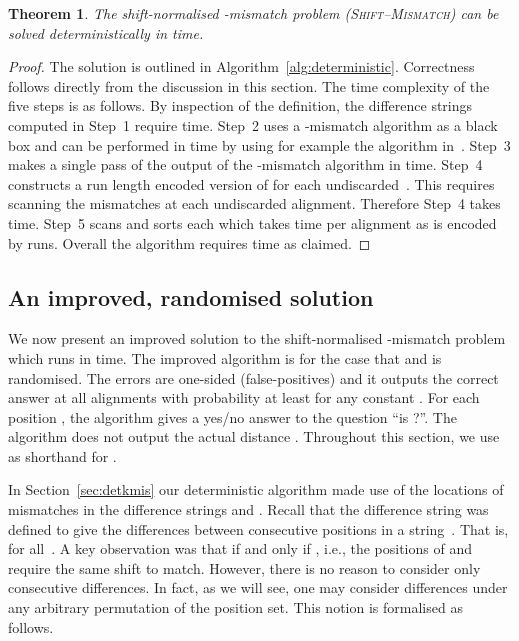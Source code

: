 \documentclass[11pt]{article}
\newcommand{\skMismatch}{\textsc{Shift--Mismatch}\xspace}
\theoremstyle{plain}
\newtheorem{theorem}{Theorem}[]
\theoremstyle{definition}
\begin{document}
\begin{theorem}
    \label{thm:detkmis}
    The shift-normalised -mismatch problem (\skMismatch) can be solved deterministically in  time.
\end{theorem}
\begin{proof}
    The solution is outlined in Algorithm~\ref{alg:deterministic}. Correctness follows directly from the discussion in this section. The time complexity of the five steps is as follows. By inspection of the definition, the difference strings computed in Step~1 require  time. Step~2 uses a -mismatch algorithm as a black box and can be performed in  time by using for example the algorithm in~\cite{LV:1986a}. Step~3 makes a single pass of the output of the -mismatch algorithm in  time. Step~4 constructs a run length encoded version of  for each undiscarded~. This requires scanning the  mismatches at each undiscarded alignment. Therefore Step~4 takes  time. Step~5 scans and sorts each  which takes  time per alignment as  is encoded by  runs. Overall the algorithm requires  time as claimed.
\end{proof}


\subsection{An improved, randomised solution} \label{sec:randkmis}

We now present an improved solution to the shift-normalised -mismatch problem which runs in  time. The improved algorithm is for the case that  and is randomised. The errors are one-sided (false-positives) and it outputs the correct answer at all alignments with probability at least  for any constant . For each position , the algorithm gives a yes/no answer to the question ``is ?''. The algorithm does not output the actual distance . Throughout this section, we use  as shorthand for .

In Section~\ref{sec:detkmis} our deterministic algorithm made use of the locations of mismatches in the difference strings  and . Recall that the difference string  was defined to give the differences between consecutive positions in a string~. That is,  for all~. A key observation was that  if and only if , i.e., the positions of  and  require the same shift  to match. However, there is no reason to consider only consecutive differences. In fact, as we will see, one may consider differences under any arbitrary permutation of the position set. This notion is formalised as follows.
\end{document}
